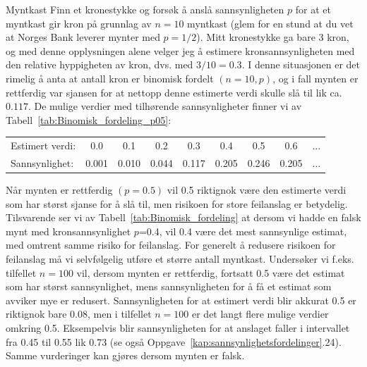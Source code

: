 \begin{eksempel}{Myntkast}
Finn et kronestykke og forsøk å anslå sannsynligheten $p$ for at
et myntkast gir kron på grunnlag av $n=10$ myntkast (glem for en
stund at du vet at Norges Bank leverer mynter med $p=1/2$). Mitt
kronestykke ga bare 3 kron, og med denne opplysningen alene
velger jeg å estimere kronsannsynligheten med den relative
hyppigheten av kron, dvs. med $3/10=0.3$. I denne situasjonen er
det rimelig å anta at antall kron er binomisk fordelt $(n=10,p)$,
og i fall mynten er rettferdig var sjansen for at nettopp denne
estimerte verdi skulle slå til lik ca. $0.117$. De mulige verdier
med tilhørende sannsynligheter finner vi av Tabell~\ref{tab:Binomisk_fordeling_p05}:
\begin{center} \addtolength{\tabcolsep}{-0.3\tabcolsep}
\begin{tabular}{lcccccccc}
Estimert verdi: & 0.0 & 0.1 & 0.2 & 0.3 & 0.4 & 0.5 & 0.6 & $\ldots $ \\
Sannsynlighet:  &0.001& 0.010 & 0.044 & 0.117 & 0.205 & 0.246 & 0.205&$\ldots$
\end{tabular}
\end{center}
\noindent Når mynten er rettferdig $(p=0.5)$ vil 0.5 riktignok være den
estimerte verdi som har størst sjanse for å slå til, men risikoen
for store feilanslag er betydelig. Tilsvarende ser vi av Tabell~\ref{tab:Binomisk_fordeling}
at dersom vi hadde en falsk mynt med kronsannsynlighet
$p$=0.4, vil 0.4 være det mest sannsynlige estimat, med omtrent
samme risiko for feilanslag. For generelt å redusere risikoen for
feilanslag må vi selvfølgelig utføre et større antall myntkast.
Undersøker vi f.eks. tilfellet $n=100$ vil, dersom mynten er
rettferdig, fortsatt 0.5 være det estimat som har størst
sannsynlighet, mens sannsynligheten for å få et estimat som
avviker mye er redusert. Sannsynligheten for at estimert verdi
blir akkurat 0.5 er riktignok bare 0.08, men i tilfellet
$n=100$ er det langt flere mulige verdier omkring 0.5. Eksempelvis
blir sannsynligheten for at anslaget faller i intervallet fra
	0.45 til 0.55 lik 0.73 (se også Oppgave~\ref*{kap:sannsynlighetsfordelinger}.24). Samme
vurderinger kan gjøres dersom mynten er falsk.
\end{eksempel}

\begin{center}  \end{center}

